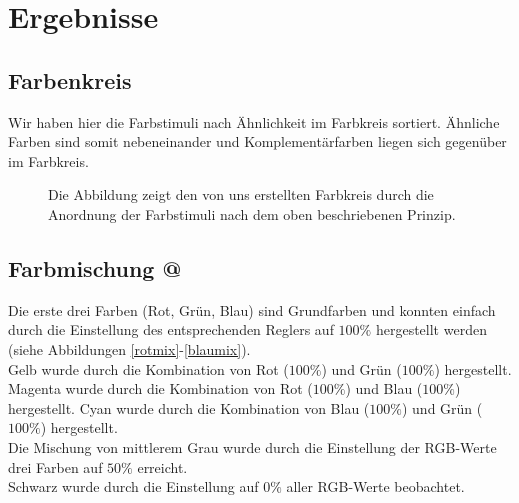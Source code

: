 \documentclass[11pt]{article}
\makeatletter
\newcommand*{\rom}[1]{\expandafter\@slowromancap\romannumeral #1@}
\makeatother
\begin{document}
\section{Ergebnisse}
\subsection{Farbenkreis}
Wir haben hier die Farbstimuli nach Ähnlichkeit im Farbkreis sortiert. Ähnliche Farben sind somit nebeneinander und Komplementärfarben liegen sich gegenüber im Farbkreis. 
\begin{figure}[H]
\caption{Die Abbildung zeigt den von uns erstellten Farbkreis durch die Anordnung der Farbstimuli nach dem oben beschriebenen Prinzip.}
\label{farbkreis}
\end{figure}


\subsection{Farbmischung \rom{1}}
Die erste drei Farben (Rot, Grün, Blau) sind Grundfarben und konnten einfach durch die Einstellung des entsprechenden Reglers auf $100\%$ hergestellt werden (siehe Abbildungen \ref{rotmix}-\ref{blaumix}).  \\
Gelb wurde durch die Kombination von Rot ($100\%$) und Grün ($100\%$) hergestellt. 
Magenta wurde durch die Kombination von Rot ($100\%$) und Blau ($100\%$) hergestellt. 
Cyan wurde durch die Kombination von Blau ($100\%$) und Grün ($100\%$) hergestellt.  \\
Die Mischung von mittlerem Grau wurde durch die Einstellung der RGB-Werte drei Farben auf $50\%$ erreicht. \\
Schwarz wurde durch die Einstellung auf $0\%$ aller RGB-Werte beobachtet. \\
\end{document}
